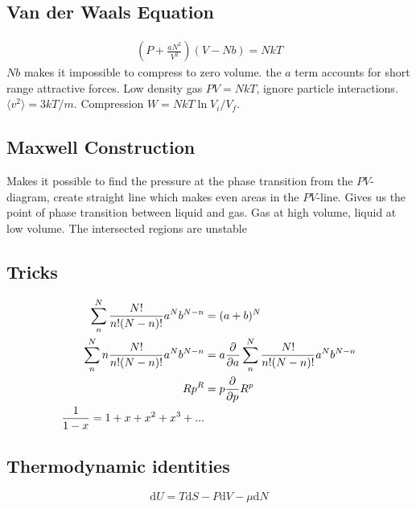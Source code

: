 \documentclass[a4paper, norsk, 8pt]{article}
\begin{document}
\begin{multicols*}{3}
\subsection*{\footnotesize  Van der Waals Equation}
\begin{align*}
    \left( P + \frac{aN^2}{V^2}\right)\left(V-Nb\right) = NkT
\end{align*}
$Nb$ makes it impossible to compress to zero volume. the $a$ term accounts for short range attractive forces.
Low density gas $PV=NkT$, ignore particle interactions. $\langle v^2 \rangle = 3kT/m$. Compression $W =NkT\ln{V_i/V_f}$.

\subsection*{\footnotesize Maxwell Construction}
Makes it possible to find the pressure at the phase transition from the $PV$-diagram, create straight line which makes even areas in the $PV$-line. Gives us the point of phase transition between liquid and gas. Gas at high volume, liquid at low volume. The intersected regions are unstable
\subsection*{\footnotesize  Tricks}
\begin{align*}
  \sum_{n}^{N} \frac{N!}{n!(N-n)!}a^Nb^{N-n} &= (a+b)^N \\
  \sum_{n}^{N} n\frac{N!}{n!(N-n)!}a^Nb^{N-n} &= a\pdv{}{a}\sum_{n}^{N} \frac{N!}{n!(N-n)!}a^Nb^{N-n} \\
  Rp^{R} &= p \pdv{}{p}R^{p} \\
  \frac{1}{1-x} = 1 + x + x^2 + x^3 +...
\end{align*}

\subsection*{\footnotesize  Thermodynamic identities}
\begin{equation}
    \mbox{d}U = T\mbox{d}S -P\mbox{d}V - \mu\mbox{d}N
\end{equation}


\end{multicols*}
\end{document}
